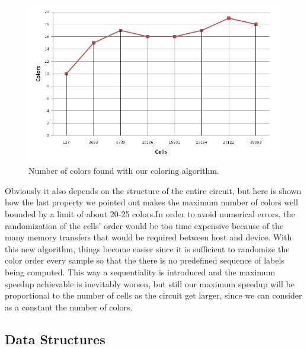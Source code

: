\begin{figure}[h!tb]
				\centering
				\includegraphics[scale=0.5]{img/color_table.png}
				\caption{Number of colors found with our coloring algorithm.}
				\label{fig:color_table}
\end{figure}
Obviously it also depends on the structure of the entire circuit, but here is shown how the last property we pointed out makes the 
maximum number of colors well bounded by a limit of about 20-25 colors.\newline In order to avoid numerical errors, the randomization 
of the cells' order would be too time expensive because of the many memory transfers that would be required between host and device. 
With this new algorithm, things become easier since it is sufficient to randomize the color order every sample so that the there is no
 predefined sequence of labels being computed.\newline
This way a sequentiality is introduced and the maximum speedup achievable is inevitably worsen, but still our maximum speedup will be 
proportional to the number of cells as the circuit get larger, since we can consider as a constant the number of colors.

\subsection{Data Structures}
